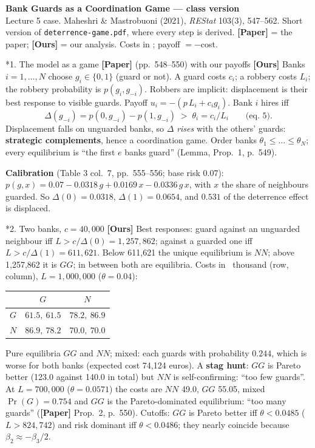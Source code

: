 \documentclass[10pt,a4paper]{article}
\makeatletter
\renewcommand\section{\@startsection{section}{1}{\z@}{6pt plus 2pt}{2pt}{\normalfont\large\bfseries}}
\newcommand{\eur}{\texteuro{}}
\newcommand{\Dl}{\Delta}
\newcommand{\paper}{\textbf{[Paper]}}
\newcommand{\ours}{\textbf{[Ours]}}
\makeatother
\begin{document}
\begin{center}
{\Large\bfseries Bank Guards as a Coordination Game --- class version}\\[2pt]
{\small Lecture 5 case. Maheshri \& Mastrobuoni (2021), \emph{REStat} 103(3), 547--562. Short version of
\texttt{deterrence-game.pdf}, where every step is derived. \paper{} = the paper; \ours{} = our analysis.
Costs in \eur; payoff $=-$cost.}
\end{center}

\section*{1. The model as a game \paper{} (pp.\ 548--550) with our payoffs \ours{}}
Banks $i=1,\dots,N$ choose $g_i\in\{0,1\}$ (guard or not). A guard costs $c_i$; a robbery costs $L_i$; the
robbery probability is $p(g_i,g_{-i})$. Robbers are implicit: displacement is their best response to
visible guards. Payoff $u_i=-(p\,L_i+c_i g_i)$. Bank $i$ hires iff
\[
  \Dl(g_{-i})=p(0,g_{-i})-p(1,g_{-i})\;>\;\theta_i=c_i/L_i \qquad\text{(eq.\ 5)}.
\]
Displacement falls on unguarded banks, so $\Dl$ \emph{rises} with the others' guards: \textbf{strategic complements},
hence a coordination game. Order banks $\theta_1\le\dots\le\theta_N$; every equilibrium is ``the first $e$ banks guard''
(Lemma, Prop.\ 1, p.\ 549).

\textbf{Calibration} (Table 3 col.\ 7, pp.\ 555--556; base risk 0.07): $p(g,x)=0.07-0.0318\,g+0.0169\,x-0.0336\,g\,x$, with
$x$ the share of neighbours guarded. So $\Dl(0)=0.0318$, $\Dl(1)=0.0654$, and $0.531$ of the deterrence effect is displaced.

\section*{2. Two banks, $c=40{,}000$ \ours{}}
Best responses: guard against an unguarded neighbour iff $L>c/\Dl(0)=1{,}257{,}862$; against a guarded one iff
$L>c/\Dl(1)=611{,}621$. Below 611,621 the unique equilibrium is $NN$; above 1,257,862 it is $GG$; in between both are equilibria.
Costs in \eur\ thousand (row, column), $L=1{,}000{,}000$ ($\theta=0.04$):
\begin{center}\small
\begin{tabular}{c|cc}
 & $G$ & $N$\\\hline
$G$ & $\mathbf{61.5},\ \mathbf{61.5}$ & $78.2,\ 86.9$\\
$N$ & $86.9,\ 78.2$ & $\mathbf{70.0},\ \mathbf{70.0}$
\end{tabular}
\end{center}
Pure equilibria $GG$ and $NN$; mixed: each guards with probability $0.244$, which is worse for both banks (expected cost 74,124 euros). A \textbf{stag hunt}: $GG$ is Pareto better (123.0 against 140.0 in total) but $NN$ is self-confirming: ``too few guards''.
At $L=700{,}000$ ($\theta=0.0571$) the costs are $NN$ 49.0, $GG$ 55.05, mixed $\Pr(G)=0.754$ and $GG$ is the Pareto-dominated
equilibrium: ``too many guards'' (\paper{} Prop.\ 2, p.\ 550). Cutoffs: $GG$ is Pareto better iff $\theta<0.0485$ ($L>824{,}742$) and risk
dominant iff $\theta<0.0486$; they nearly coincide because $\beta_2\approx-\beta_3/2$.
\end{document}
